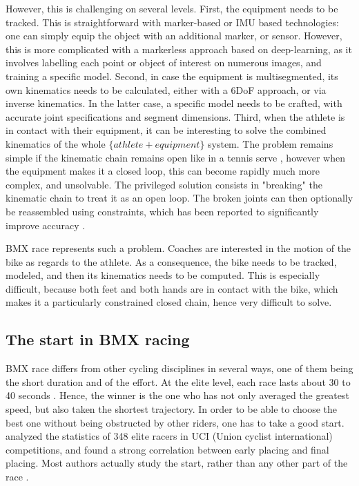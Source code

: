 However, this is challenging on several levels. First, the equipment needs to be tracked. This is straightforward with marker-based or IMU based technologies: one can simply equip the object with an additional marker, or sensor. However, this is more complicated with a markerless approach based on deep-learning, as it involves labelling each point or object of interest on numerous images, and training a specific model. Second, in case the equipment is multisegmented, its own kinematics needs to be calculated, either with a 6DoF approach, or via inverse kinematics. In the latter case, a specific model needs to be crafted, with accurate joint specifications and segment dimensions. Third, when the athlete is in contact with their equipment, it can be interesting to solve the combined kinematics of the whole $\{athlete+equipment\}$ system. The problem remains simple if the kinematic chain remains open like in a tennis serve \cite{Martin2013}, however when the equipment makes it a closed loop, this can become rapidly much more complex, and unsolvable. The privileged solution consists in "breaking" the kinematic chain to treat it as an open loop. The broken joints can then optionally be reassembled using constraints, which has been reported to significantly improve accuracy \cite{Rosenhahn2008,Fohanno2014}.

BMX race represents such a problem. Coaches are interested in the motion of the bike as regards to the athlete. As a consequence, the bike needs to be tracked, modeled, and then its kinematics needs to be computed. This is especially difficult, because both feet and both hands are in contact with the bike, which makes it a particularly constrained closed chain, hence very difficult to solve. 


\subsection{The start in BMX racing}
BMX race differs from other cycling disciplines in several ways, one of them being the short duration and of the effort. At the elite level, each race lasts about 30 to 40 seconds \cite{Cowell2012}. Hence, the winner is the one who has not only averaged the greatest speed, but also taken the shortest trajectory. In order to be able to choose the best one without being obstructed by other riders, one has to take a good start. \cite{Rylands2014} analyzed the statistics of 348 elite racers in UCI (Union cyclist international) competitions, and found a strong correlation between early placing and final placing. Most authors actually study the start, rather than any other part of the race \cite{Zabala2009,Gianikellis2011,Chiementin2012,Kalichova2013,Rylands2014}.

